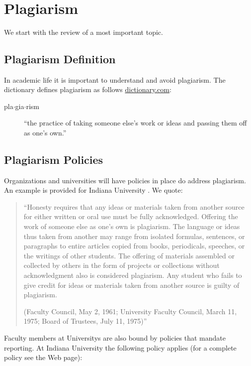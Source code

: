 \FILENAME\

\section{Plagiarism}\label{S:plagiarism}

We start with the review of a most important topic.

\subsection{Plagiarism Definition}

In academic life it is important to understand and avoid plagiarism.
The dictionary defines plagiarism as follows \url{dictionary.com}:


\begin{description}
\item[pla$\cdot$gia$\cdot$rism] ``the practice of taking someone else's work or ideas and passing them
off as one's own.''
\end{description}



\subsection{Plagiarism Policies}
Organizations and universities will have policies in place do address
plagiarism. An example is provided for Indiana University
\cite{www-iu-plagiarism}. We quote:

\begin{quotation}
``Honesty requires that any ideas or materials taken from
another source for either written or oral use must be fully
acknowledged. Offering the work of someone else as one's own is
plagiarism. The language or ideas thus taken from another may range
from isolated formulas, sentences, or paragraphs to entire articles
copied from books, periodicals, speeches, or the writings of other
students. The offering of materials assembled or collected by others
in the form of projects or collections without acknowledgment also is
considered plagiarism. Any student who fails to give credit for ideas
or materials taken from another source is guilty of plagiarism. 

(Faculty Council, May 2, 1961; University Faculty Council, March 11,
1975; Board of Trustees, July 11, 1975)''
\end{quotation}

Faculty members at Universitys are also bound by policies that mandate
reporting. At Indiana University the following policy applies (for a
complete policy see the Web page):

